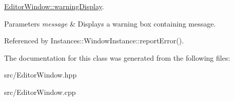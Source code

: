 \hyperlink{classEditorWindow_ac40c7db381c4aa179667cc3803503880}{Editor\+Window\+::warning\+Display}. 


\begin{DoxyParams}{Parameters}
{\em message} & Displays a warning box containing message. \\
\hline
\end{DoxyParams}


Referenced by Instances\+::\+Window\+Instance\+::report\+Error().



The documentation for this class was generated from the following files\+:\begin{DoxyCompactItemize}
\item 
src/Editor\+Window.\+hpp\item 
src/Editor\+Window.\+cpp\end{DoxyCompactItemize}

